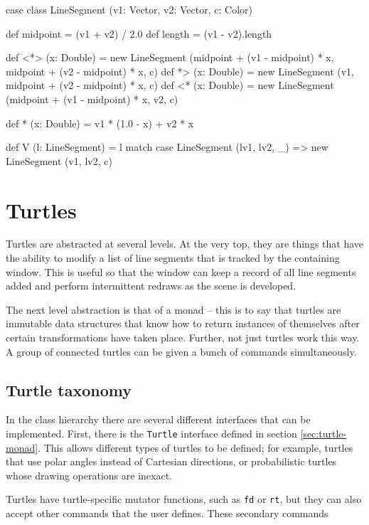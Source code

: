 \documentclass{article}
\begin{document}
      \begin{scalacode}
case class LineSegment (v1: Vector, v2: Vector, c: Color) {
  def midpoint = (v1 + v2) / 2.0
  def length   = (v1 - v2).length

  def <*> (x: Double) = new LineSegment (midpoint + (v1 - midpoint) * x, midpoint + (v2 - midpoint) * x, c)
  def  *> (x: Double) = new LineSegment (v1, midpoint + (v2 - midpoint) * x, c)
  def <*  (x: Double) = new LineSegment (midpoint + (v1 - midpoint) * x, v2, c)

  def * (x: Double) = v1 * (1.0 - x) + v2 * x

  def V (l: LineSegment) = l match {
    case LineSegment (lv1, lv2, _) => new LineSegment (v1, lv2, c)}
}
      \end{scalacode}

  \section{Turtles}
    \label{sec:turtles}

    Turtles are abstracted at several levels. At the very top, they are things that have the ability to modify a list of line segments that is tracked by the
    containing window. This is useful so that the window can keep a record of all line segments added and perform intermittent redraws as the scene is
    developed.

    The next level abstraction is that of a monad -- this is to say that turtles are immutable data structures that know how to return instances of themselves
    after certain transformations have taken place. Further, not just turtles work this way. A group of connected turtles can be given a bunch of commands
    simultaneously.

    \subsection{Turtle taxonomy}
      \label{sec:turtle-taxonomy}

      In the class hierarchy there are several different interfaces that can be implemented. First, there is the {\tt Turtle} interface defined in section
      \ref{sec:turtle-monad}. This allows different types of turtles to be defined; for example, turtles that use polar angles instead of Cartesian directions,
      or probabilistic turtles whose drawing operations are inexact.

      Turtles have turtle-specific mutator functions, such as {\tt fd} or {\tt rt}, but they can also accept other commands that the user defines. These
      secondary commands
\end{document}
